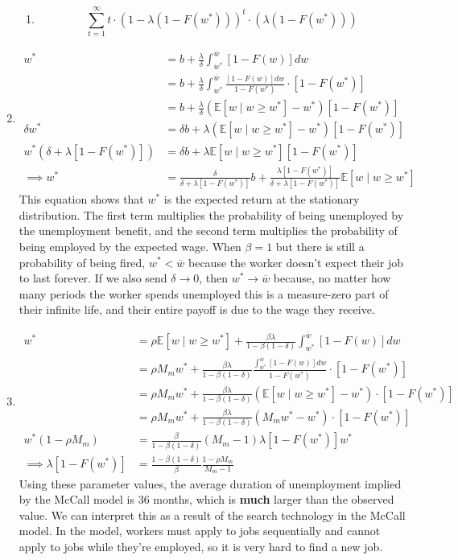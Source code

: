 \documentclass[11pt]{article}
\begin{document}
\begin{enumerate}
\begin{enumerate}
\item 
\[
\sum^\infty_{t = 1} t \cdot (1 - \lambda (1 - F(w^*)))^t \cdot (\lambda (1 - F(w^*)))
\]
\end{enumerate}
\item 
\begin{align*}
w^* &= b + \frac{\lambda}{\delta} \int^{\overline{w}}_{w^*} [1 - F(w)]dw\\
&= b + \frac{\lambda}{\delta}\int^{\overline{w}}_{w^*} \frac{[1 - F(w)]dw}{1 - F(w^*)}\cdot [1 - F(w^*)]\\
&= b + \frac{\lambda}{\delta} (\mathbb{E} [w \mid w \ge w^*] - w^*)[1 - F(w^*)]\\
\delta w^* &= \delta b + \lambda (\mathbb{E}[w \mid w \ge w^*] - w^*)[1 - F(w^*)]\\
w^* (\delta + \lambda[1 - F(w^*)]) &= \delta b + \lambda \mathbb{E}[w \mid w \ge w^*][1 - F(w^*)]\\
\implies w^* &= \frac{\delta}{\delta + \lambda[1 - F(w^*)]} b + \frac{\lambda [1 - F(w^*)]}{\delta + \lambda[1 - F(w^*)]} \mathbb{E}[w \mid w \ge w^*]
\end{align*}
This equation shows that \(w^*\) is the expected return at the stationary distribution. The first term multiplies the probability of being unemployed by the unemployment benefit, and the second term multiplies the probability of being employed by the expected wage. When \(\beta = 1\) but there is still a probability of being fired, \(w^* < \overline{w}\) because the worker doesn't expect their job to last forever. If we also send \(\delta \to 0\), then \(w^* \to \overline{w}\) because, no matter how many periods the worker spends unemployed this is a measure-zero part of their infinite life, and their entire payoff is due to the wage they receive.

\item 
\begin{align*}
w^* &= \rho \mathbb{E} [w \mid w \ge w^*] + \frac{\beta \lambda}{1 - \beta(1 - \delta)} \int^{\overline{w}}_{w^*} [1 - F(w)]dw\\
&= \rho M_m w^* + \frac{\beta \lambda}{1 - \beta(1 - \delta)} \frac{\int^{\overline{w}}_{w^*} [1 - F(w)]dw}{1 - F(w^*)} \cdot [1 - F(w^*)] \\
&= \rho M_m w^* + \frac{\beta \lambda}{1 - \beta(1 - \delta)} (\mathbb{E}[w \mid w \ge w^*] - w^*)\cdot [1 - F(w^*)] \\
&= \rho M_m w^* + \frac{\beta \lambda}{1 - \beta(1 - \delta)} (M_m w^* - w^*)\cdot [1 - F(w^*)] \\
w^*(1 - \rho M_m) &= \frac{\beta}{1 - \beta (1 - \delta)} (M_m - 1) \lambda [1 - F(w^*)] w^*\\
\implies \lambda [1 - F(w^*)] &= \frac{1 - \beta(1 - \delta)}{\beta} \frac{1 - \rho M_m}{M_m - 1}
\end{align*}
Using these parameter values, the average duration of unemployment implied by the McCall model is 36 months, which is \textbf{much} larger than the observed value. We can interpret this as a result of the search technology in the McCall model. In the model, workers must apply to jobs sequentially and cannot apply to jobs while they're employed, so it is very hard to find a new job.
  \end{enumerate}
\end{document}
